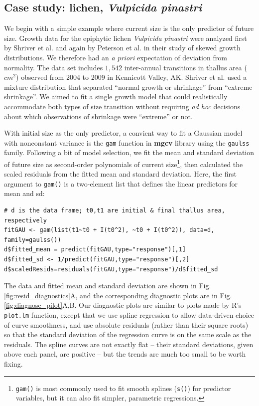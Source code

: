 \documentclass[12pt]{article}
\begin{document}
\begin{spacing}{1.9}
\section{Case study: lichen, \emph{Vulpicida pinastri}}
\label{sec:lichenCaseStudy} 
We begin with a simple example where current size is the only predictor of future size. 
Growth data for the epiphytic lichen \emph{Vulpicida pinastri} were analyzed first by Shriver et al. \citeyear{shriver2012comparative} and again by Peterson et al. \citeyear{peterson2019improving} in their study of skewed growth distributions. 
We therefore had an \emph{a priori} expectation of deviation from normality. 
The data set includes $1,542$ inter-annual transitions in thallus area ($cm^2$) observed from 2004 to 2009 in Kennicott Valley, AK. 
Shriver et al. \citeyear{shriver2012comparative} used a mixture distribution that separated ``normal growth or shrinkage'' from ``extreme shrinkage''. 
We aimed to fit a single growth model that could realistically accommodate both types of size transition without requiring \emph{ad hoc} decisions about which observations of shrinkage were ``extreme'' or not. 

With initial size as the only predictor, a convient way to fit a Gaussian model with nonconstant variance is the \texttt{gam} function in \textbf{mgcv} library \citep{wood-2017} using the \texttt{gaulss} family. 
Following a bit of model selection, we fit the mean and standard deviation of future size as second-order polynomials of current size\footnote{\texttt{gam()} is most commonly used to fit smooth splines (\texttt{s()}) for predictor variables, but it can also fit simpler, parametric regressions.}, then calculated the scaled residuals from the fitted mean and standard deviation.
Here, the first argument to \texttt{gam()} is a two-element list that defines the linear predictors for mean and sd:
\begin{lstlisting}
# d is the data frame; t0,t1 are initial & final thallus area, respectively
fitGAU <- gam(list(t1~t0 + I(t0^2), ~t0 + I(t0^2)), data=d, family=gaulss())
d$fitted_mean = predict(fitGAU,type="response")[,1]
d$fitted_sd <- 1/predict(fitGAU,type="response")[,2]
d$scaledResids=residuals(fitGAU,type="response")/d$fitted_sd
\end{lstlisting}
The data and fitted mean and standard deviation are shown in Fig. \ref{fig:resid_diagnostics}A, and the corresponding diagnostic plots are in Fig. \ref{fig:diagnose_pilot}A,B. 
Our diagnostic plots are similar to plots made by R's \texttt{plot.lm} function, except that we use spline regression to allow data-driven choice 
of curve smoothness, and use absolute residuals (rather than their square roots) so that the standard deviation of the regression curve is 
on the same scale as the residuals. 
The spline curves are not exactly flat  -- their standard deviations, given above each panel, are positive -- but the trends are much too small to be worth fixing. 


\end{spacing}
\end{document}
